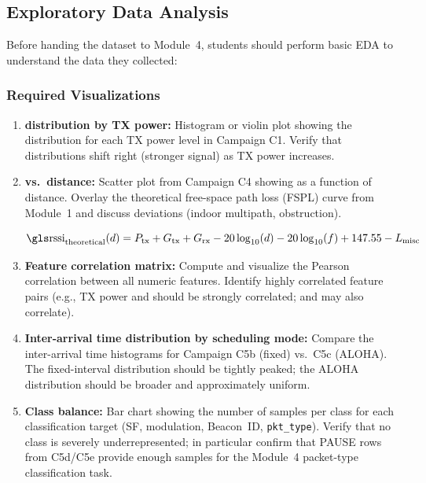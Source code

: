\documentclass[11pt,letterpaper]{article}
\begin{document}
	\subsection{Exploratory Data Analysis}

	Before handing the dataset to Module~4, students should perform basic EDA to understand the data they collected:

	\subsubsection{Required Visualizations}

	\begin{enumerate}[leftmargin=2em]
		\item \textbf{\RSSI{} distribution by TX power:} Histogram or violin plot showing the \RSSI{} distribution for each TX power level in Campaign C1. Verify that distributions shift right (stronger signal) as TX power increases.
		\item \textbf{\RSSI{} vs.\ distance:} Scatter plot from Campaign C4 showing \RSSI{} as a function of distance. Overlay the theoretical free-space path loss (FSPL) curve from Module~1 and discuss deviations (indoor multipath, obstruction).

		\begin{equation}
			\text{\RSSI{}}_{\text{theoretical}}(d) = P_{\text{tx}} + G_{\text{tx}} + G_{\text{rx}} - 20\log_{10}(d) - 20\log_{10}(f) + 147.55 - L_{\text{misc}}
			\label{eq:rssi_vs_distance}
		\end{equation}

		\item \textbf{Feature correlation matrix:} Compute and visualize the Pearson correlation between all numeric features. Identify highly correlated feature pairs (e.g., TX power and \RSSI{} should be strongly correlated; \RSSI{} and \SNR{} may also correlate).
		\item \textbf{Inter-arrival time distribution by scheduling mode:} Compare the inter-arrival time histograms for Campaign C5b (fixed) vs.\ C5c (ALOHA). The fixed-interval distribution should be tightly peaked; the ALOHA distribution should be broader and approximately uniform.
		\item \textbf{Class balance:} Bar chart showing the number of samples per class for each classification target (SF, modulation, Beacon~ID, \texttt{pkt\_type}). Verify that no class is severely underrepresented; in particular confirm that PAUSE rows from C5d/C5e provide enough samples for the Module~4 packet-type classification task.
	\end{enumerate}
\end{document}
